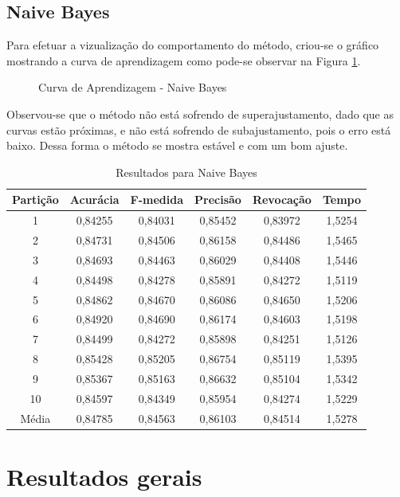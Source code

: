 \subsection{Naive Bayes}
	
Para efetuar a vizualização do comportamento do método, criou-se o gráfico mostrando a curva de aprendizagem como pode-se observar na Figura \ref{fig:NaiveBayes}.

\begin{figure}[h]
	\centering
{}
\caption{Curva de Aprendizagem - Naive Bayes}
\label{fig:NaiveBayes}
\end{figure}

Observou-se que o método não está sofrendo de superajustamento, dado que as curvas estão próximas, e não está sofrendo de subajustamento, pois o erro está baixo. Dessa forma o método se mostra estável e com um bom ajuste.

\begin{table}[h]
\centering
\caption{Resultados para Naive Bayes}
\vspace{0.2cm}
\begin{tabular}{c|c|c|c|c|c}
Partição & Acurácia & F-medida & Precisão & Revocação & Tempo \\
\hline
1  & 0,84255 & 0,84031 & 0,85452 & 0,83972 & 1,5254 \\
2  & 0,84731 & 0,84506 & 0,86158 & 0,84486 & 1,5465 \\
3  & 0,84693 & 0,84463 & 0,86029 & 0,84408 & 1,5446 \\
4  & 0,84498 & 0,84278 & 0,85891 & 0,84272 & 1,5119 \\
5  & 0,84862 & 0,84670 & 0,86086 & 0,84650 & 1,5206 \\
6  & 0,84920 & 0,84690 & 0,86174 & 0,84603 & 1,5198 \\
7  & 0,84499 & 0,84272 & 0,85898 & 0,84251 & 1,5126 \\
8  & 0,85428 & 0,85205 & 0,86754 & 0,85119 & 1,5395 \\
9  & 0,85367 & 0,85163 & 0,86632 & 0,85104 & 1,5342 \\
10 & 0,84597 & 0,84349 & 0,85954 & 0,84274 & 1,5229 \\
\hline
Média & 0,84785 & 0,84563 & 0,86103 & 0,84514 & 1,5278 \\

\end{tabular} 
\label{table:resultadosNB}
\end{table}

\section{Resultados gerais}


